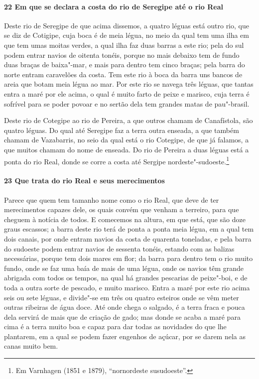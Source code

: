 \paragraph{22 Em que se declara a costa do rio de Seregipe até o rio Real}

Deste rio de Seregipe de que acima dissemos, a quatro léguas está outro rio, que se diz de
Cotigipe, cuja boca é de meia légua, no meio da qual tem uma ilha em que tem umas moitas
verdes, a qual ilha faz duas barras a este rio; pela do sul podem entrar navios de oitenta
tonéis, porque no mais debaixo tem de fundo duas braças de baixa"-mar, e mais para dentro
tem cinco braças; pela barra do norte entram caravelões da costa. Tem este rio à boca da
barra uns bancos de areia que botam meia légua ao mar. Por este rio se navega três léguas,
que tantas entra a maré por ele acima, o qual é muito farto de peixe e marisco, cuja terra
é sofrível para se poder povoar e no sertão dela tem grandes matas de pau"-brasil.

Deste rio de Cotegipe ao rio de Pereira, a que outros chamam de Canafístola, são quatro
léguas. Do qual até Seregipe faz a terra outra enseada, a que também chamam de Vazabarris,
no seio da qual está o rio Cotegipe, de que já falamos, a que muitos chamam do nome de
enseada. Do rio de Pereira a duas léguas está a ponta do rio Real, donde se corre a costa
até Sergipe nordeste"-sudoeste.\footnote{ Em Varnhagen (1851 e 1879), ``nornordeste
susudoeste''.}

\paragraph{23 Que trata do rio Real e seus merecimentos}

Parece que quem tem tamanho nome como o rio Real, que deve de ter merecimentos capazes
dele, os quais convém que venham a terreiro, para que cheguem à notícia de todos. E
comecemos na altura, em que está, que são doze graus escassos; a barra deste rio terá de
ponta a ponta meia légua, em a qual tem dois canais, por onde entram navios da costa de
quarenta toneladas, e pela barra do sudoeste podem entrar navios de sessenta tonéis,
estando com as balizas necessárias, porque tem dois mares em flor; da barra para dentro
tem o rio muito fundo, onde se faz uma baía de mais de uma légua, onde os navios têm
grande abrigada com todos os tempos, na qual há grandes pescarias de peixe"-boi, e de toda
a outra sorte de pescado, e muito marisco. Entra a maré por este rio acima seis ou sete
léguas, e divide"-se em três ou quatro esteiros onde se vêm meter outras ribeiras de água
doce. Até onde chega o salgado, é a terra fraca e pouca dela servirá de mais que de
criação de gado; mas donde se acaba a maré para cima é a terra muito boa e capaz para dar
todas as novidades do que lhe plantarem, em a qual se podem fazer engenhos de açúcar, por
se darem nela as canas muito bem.

